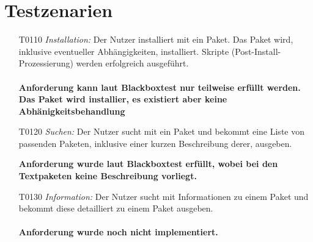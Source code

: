 \chapter{Testzenarien}
\begin{itemize}
	\item[T0110] \textit{Installation:}	Der Nutzer installiert mit  ein Paket. Das Paket wird, inklusive eventueller Abhängigkeiten, installiert. Skripte (Post-Install-Prozessierung) werden erfolgreich ausgeführt.\\\\
	\textbf{Anforderung kann laut Blackboxtest nur teilweise erfüllt werden. Das Paket wird installier, es existiert aber keine Abhänigkeitsbehandlung}
	\item[T0120] \textit{Suchen:} Der Nutzer sucht mit  ein Paket und bekommt eine Liste von passenden Paketen, inklusive einer kurzen Beschreibung derer, ausgeben.
    
    \textbf{Anforderung wurde laut Blackboxtest erfüllt, wobei bei den Textpaketen keine Beschreibung vorliegt.}
    
	\item[T0130] \textit{Information:} Der Nutzer sucht mit  Informationen zu einem Paket und bekommt diese detailliert zu einem Paket ausgeben.\\\\
	\textbf{Anforderung wurde noch nicht implementiert.}
	

\end{itemize}
